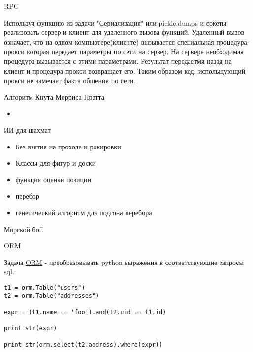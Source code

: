 \documentclass{article}
\begin{document}
\begin{center} RPC \end{center}
Используя функцию из задачи "Сериализация" или pickle.dumps и сокеты 
реализовать сервер и клиент для удаленного вызова функций. Удаленный вызов
означает, что на одном компьютере(клиенте) вызывается специальная процедура-прокси
которая передает параметры по сети на сервер. На сервере необходимая процедура 
вызывается с этими параметрами. Результат передаетмя назад на клиент и 
процедура-прокси возвращает его. Таким образом код, испольщующий прокси не замечает
факта общения по сети.
\newpage

\begin{center} Алгоритм Кнута-Морриса-Пратта \end{center}
\begin{itemize}
    \item 
\end{itemize}
\newpage

\begin{center} ИИ для шахмат \end{center}
\begin{itemize}
    \item Без взятия на проходе и рокировки
    \item Классы для фигур и доски
    \item функция оценки позиции
    \item перебор
    \item генетический алгоритм для подгона перебора
\end{itemize}
\newpage

\begin{center} Морской бой \end{center}

\newpage

\begin{center} ORM \end{center}
Задача \href{}{ORM} - преобразовывать python выражения в соответствующие 
запросы sql.
\begin{lstlisting}
t1 = orm.Table("users")
t2 = orm.Table("addresses")

expr = (t1.name == 'foo').and(t2.uid == t1.id)

print str(expr)

print str(orm.select(t2.address).where(expr))

\end{lstlisting}
\newpage
\end{document}
